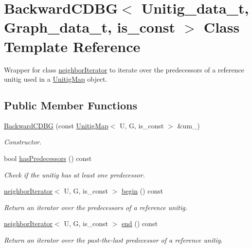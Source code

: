 \hypertarget{classBackwardCDBG}{}\section{Backward\+C\+D\+BG$<$ Unitig\+\_\+data\+\_\+t, Graph\+\_\+data\+\_\+t, is\+\_\+const $>$ Class Template Reference}
\label{classBackwardCDBG}


Wrapper for class \hyperlink{classneighborIterator}{neighbor\+Iterator} to iterate over the predecessors of a reference unitig used in a \hyperlink{classUnitigMap}{Unitig\+Map} object.  


\subsection*{Public Member Functions}
\begin{DoxyCompactItemize}
\item 
\hyperlink{classBackwardCDBG_a7535c34878c4ec0acc0543a3814c35b9}{Backward\+C\+D\+BG} (const \hyperlink{classUnitigMap}{Unitig\+Map}$<$ U, G, is\+\_\+const $>$ \&um\+\_\+)
\begin{DoxyCompactList}\small\item\em Constructor. \end{DoxyCompactList}\item 
bool \hyperlink{classBackwardCDBG_afd32793764f72b23624fc6384d934412}{has\+Predecessors} () const
\begin{DoxyCompactList}\small\item\em Check if the unitig has at least one predecessor. \end{DoxyCompactList}\item 
\hyperlink{classneighborIterator}{neighbor\+Iterator}$<$ U, G, is\+\_\+const $>$ \hyperlink{classBackwardCDBG_a134d64079a7acdcad727637647691897}{begin} () const
\begin{DoxyCompactList}\small\item\em Return an iterator over the predecessors of a reference unitig. \end{DoxyCompactList}\item 
\hyperlink{classneighborIterator}{neighbor\+Iterator}$<$ U, G, is\+\_\+const $>$ \hyperlink{classBackwardCDBG_a7b8f84da503325c3e3e2b5b024ed6997}{end} () const
\begin{DoxyCompactList}\small\item\em Return an iterator over the past-\/the-\/last predecessor of a reference unitig. \end{DoxyCompactList}\end{DoxyCompactItemize}



